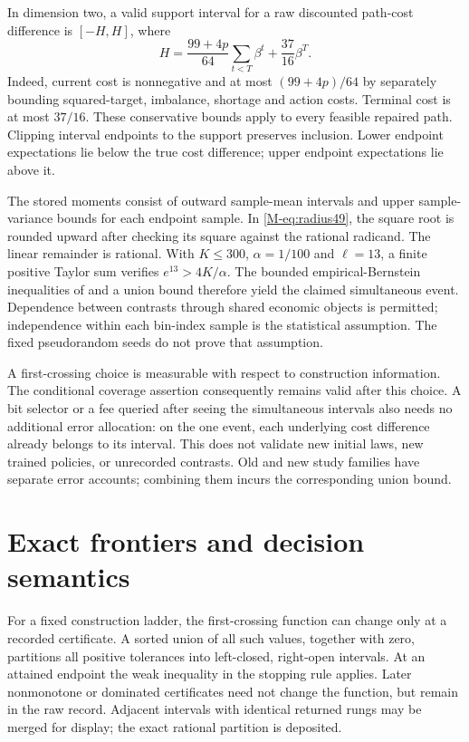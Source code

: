 \documentclass[ecta,nameyear,draft]{econsocart}
\begin{document}
In dimension two, a valid support interval for a raw discounted path-cost difference is $[-H,H]$, where
\[
 H=\frac{99+4p}{64}\sum_{t<T}\beta^t+\frac{37}{16}\beta^T.
\]
Indeed, current cost is nonnegative and at most $(99+4p)/64$ by separately bounding squared-target, imbalance, shortage and action costs. Terminal cost is at most $37/16$. These conservative bounds apply to every feasible repaired path. Clipping interval endpoints to the support preserves inclusion. Lower endpoint expectations lie below the true cost difference; upper endpoint expectations lie above it.

The stored moments consist of outward sample-mean intervals and upper sample-variance bounds for each endpoint sample. In \eqref{M-eq:radius49}, the square root is rounded upward after checking its square against the rational radicand. The linear remainder is rational. With $K\le300$, $\alpha=1/100$ and $\ell=13$, a finite positive Taylor sum verifies $e^{13}>4K/\alpha$. The bounded empirical-Bernstein inequalities of \citet{maurer2009} and a union bound therefore yield the claimed simultaneous event. Dependence between contrasts through shared economic objects is permitted; independence within each bin-index sample is the statistical assumption. The fixed pseudorandom seeds do not prove that assumption.

A first-crossing choice is measurable with respect to construction information. The conditional coverage assertion consequently remains valid after this choice. A bit selector or a fee queried after seeing the simultaneous intervals also needs no additional error allocation: on the one event, each underlying cost difference already belongs to its interval. This does not validate new initial laws, new trained policies, or unrecorded contrasts. Old and new study families have separate error accounts; combining them incurs the corresponding union bound.

\section{Exact frontiers and decision semantics}\label{supp:frontiers49}
For a fixed construction ladder, the first-crossing function can change only at a recorded certificate. A sorted union of all such values, together with zero, partitions all positive tolerances into left-closed, right-open intervals. At an attained endpoint the weak inequality in the stopping rule applies. Later nonmonotone or dominated certificates need not change the function, but remain in the raw record. Adjacent intervals with identical returned rungs may be merged for display; the exact rational partition is deposited.
\end{document}
